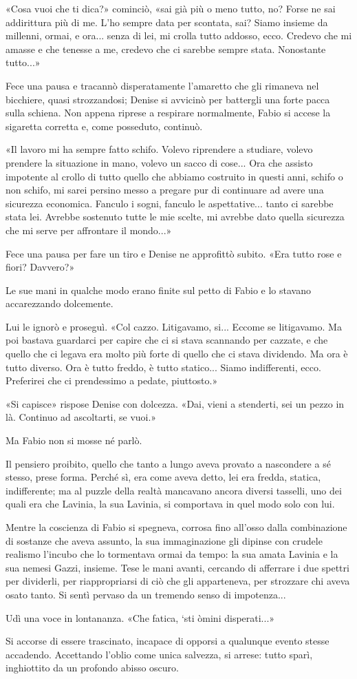 «Cosa vuoi che ti dica?» cominciò, «sai già più o meno tutto, no? Forse ne sai addirittura più di me. L'ho sempre data per scontata, sai? Siamo insieme da millenni, ormai, e ora... senza di lei, mi crolla tutto addosso, ecco. Credevo che mi amasse e che tenesse a me, credevo che ci sarebbe sempre stata. Nonostante tutto...»

Fece una pausa e tracannò disperatamente l'amaretto che gli rimaneva nel bicchiere, quasi strozzandosi; Denise si avvicinò per battergli una forte pacca sulla schiena. Non appena riprese a respirare normalmente, Fabio si accese la sigaretta corretta e, come posseduto, continuò.

«Il lavoro mi ha sempre fatto schifo. Volevo riprendere a studiare, volevo prendere la situazione in mano, volevo un sacco di cose... Ora che assisto impotente al crollo di tutto quello che abbiamo costruito in questi anni, schifo o non schifo, mi sarei persino messo a pregare pur di continuare ad avere una sicurezza economica. Fanculo i sogni, fanculo le aspettative... tanto ci sarebbe stata lei. Avrebbe sostenuto tutte le mie scelte, mi avrebbe dato quella sicurezza che mi serve per affrontare il mondo...»

Fece una pausa per fare un tiro e Denise ne approfittò subito. «Era tutto rose e fiori? Davvero?»

Le sue mani in qualche modo erano finite sul petto di Fabio e lo stavano accarezzando dolcemente.

Lui le ignorò e proseguì. «Col cazzo. Litigavamo, si... Eccome se litigavamo. Ma poi bastava guardarci per capire che ci si stava scannando per cazzate, e che quello che ci legava era molto più forte di quello che ci stava dividendo. Ma ora è tutto diverso. Ora è tutto freddo, è tutto statico... Siamo indifferenti, ecco. Preferirei che ci prendessimo a pedate, piuttosto.»

«Si capisce» rispose Denise con dolcezza. «Dai, vieni a stenderti, sei un pezzo in là. Continuo ad ascoltarti, se vuoi.»

Ma Fabio non si mosse né parlò.

Il pensiero proibito, quello che tanto a lungo aveva provato a nascondere a sé stesso, prese forma. Perché sì, era come aveva detto, lei era fredda, statica, indifferente; ma al puzzle della realtà mancavano ancora diversi tasselli, uno dei quali era che Lavinia, la sua Lavinia, si comportava in quel modo solo con lui.

Mentre la coscienza di Fabio si spegneva, corrosa fino all'osso dalla combinazione di sostanze che aveva assunto, la sua immaginazione gli dipinse con crudele realismo l'incubo che lo tormentava ormai da tempo: la sua amata Lavinia e la sua nemesi Gazzi, insieme. Tese le mani avanti, cercando di afferrare i due spettri per dividerli, per riappropriarsi di ciò che gli apparteneva, per strozzare chi aveva osato tanto. Si sentì pervaso da un tremendo senso di impotenza...

Udì una voce in lontananza. «Che fatica, `sti òmini disperati...»

Si accorse di essere trascinato, incapace di opporsi a qualunque evento stesse accadendo. Accettando l'oblio come unica salvezza, si arrese: tutto sparì, inghiottito da un profondo abisso oscuro.
